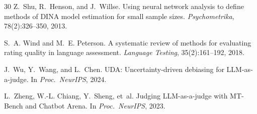 \documentclass[11pt]{article}
\begin{document}
\begin{thebibliography}{30}
Z.~Shu, R.~Henson, and J.~Willse.
\newblock Using neural network analysis to define methods of DINA model estimation for small sample sizes.
\newblock \emph{Psychometrika}, 78(2):326--350, 2013.

S.~A. Wind and M.~E. Peterson.
\newblock A systematic review of methods for evaluating rating quality in language assessment.
\newblock \emph{Language Testing}, 35(2):161--192, 2018.

J.~Wu, Y.~Wang, and L.~Chen.
\newblock UDA: Uncertainty-driven debiasing for LLM-as-a-judge.
\newblock In \emph{Proc.\ NeurIPS}, 2024.

L.~Zheng, W.-L. Chiang, Y.~Sheng, et~al.
\newblock Judging LLM-as-a-judge with MT-Bench and Chatbot Arena.
\newblock In \emph{Proc.\ NeurIPS}, 2023.

\end{thebibliography}
\end{document}
